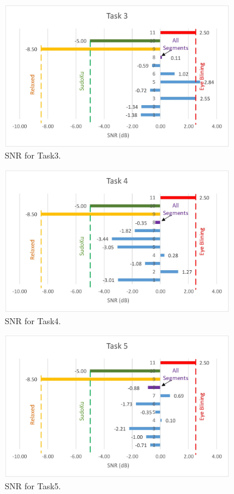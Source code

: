 \begin{figure}[hbt!]
	\centering
	\includegraphics[width=10cm]{Figures/SNRtask3.jpg} 
	\caption{SNR for Task3.} 
	\label{SNR3} 
\end{figure}


\begin{figure}[hbt!]
	\centering
	\includegraphics[width=10cm]{Figures/SNRtask4.jpg} 
	\caption{SNR for Task4.} 
	\label{SNR4} 
\end{figure}


\begin{figure}[hbt!]
	\centering
	\includegraphics[width=10cm]{Figures/SNRtask5.jpg} 
	\caption{SNR for Task5.} 
	\label{SNR5} 
\end{figure}


